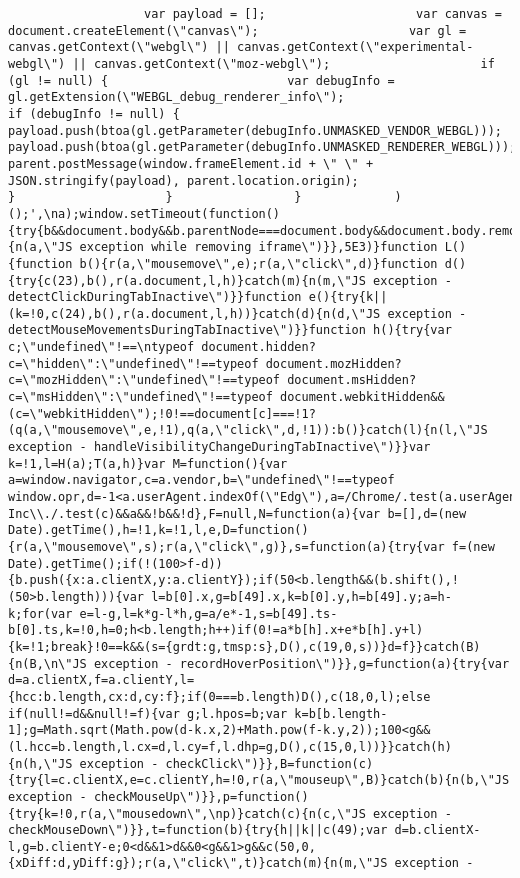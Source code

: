 \documentclass[
]{article}
\begin{document}
\begin{verbatim}
                   var payload = [];                     var canvas = document.createElement(\"canvas\");                     var gl = canvas.getContext(\"webgl\") || canvas.getContext(\"experimental-webgl\") || canvas.getContext(\"moz-webgl\");                     if (gl != null) {                         var debugInfo = gl.getExtension(\"WEBGL_debug_renderer_info\");                         if (debugInfo != null) {                             payload.push(btoa(gl.getParameter(debugInfo.UNMASKED_VENDOR_WEBGL)));                             payload.push(btoa(gl.getParameter(debugInfo.UNMASKED_RENDERER_WEBGL)));                             parent.postMessage(window.frameElement.id + \" \" + JSON.stringify(payload), parent.location.origin);                         }                     }                 }             )();',\na);window.setTimeout(function(){try{b&&document.body&&b.parentNode===document.body&&document.body.removeChild(b),b=null}catch(a){n(a,\"JS exception while removing iframe\")}},5E3)}function L(){function b(){r(a,\"mousemove\",e);r(a,\"click\",d)}function d(){try{c(23),b(),r(a.document,l,h)}catch(m){n(m,\"JS exception - detectClickDuringTabInactive\")}}function e(){try{k||(k=!0,c(24),b(),r(a.document,l,h))}catch(d){n(d,\"JS exception - detectMouseMovementsDuringTabInactive\")}}function h(){try{var c;\"undefined\"!==\ntypeof document.hidden?c=\"hidden\":\"undefined\"!==typeof document.mozHidden?c=\"mozHidden\":\"undefined\"!==typeof document.msHidden?c=\"msHidden\":\"undefined\"!==typeof document.webkitHidden&&(c=\"webkitHidden\");!0!==document[c]===!1?(q(a,\"mousemove\",e,!1),q(a,\"click\",d,!1)):b()}catch(l){n(l,\"JS exception - handleVisibilityChangeDuringTabInactive\")}}var k=!1,l=H(a);T(a,h)}var M=function(){var a=window.navigator,c=a.vendor,b=\"undefined\"!==typeof window.opr,d=-1<a.userAgent.indexOf(\"Edg\"),a=/Chrome/.test(a.userAgent);\nreturn/Google Inc\\./.test(c)&&a&&!b&&!d},F=null,N=function(a){var b=[],d=(new Date).getTime(),h=!1,k=!1,l,e,D=function(){r(a,\"mousemove\",s);r(a,\"click\",g)},s=function(a){try{var f=(new Date).getTime();if(!(100>f-d)){b.push({x:a.clientX,y:a.clientY});if(50<b.length&&(b.shift(),!(50>b.length))){var l=b[0].x,g=b[49].x,k=b[0].y,h=b[49].y;a=h-k;for(var e=l-g,l=k*g-l*h,g=a/e*-1,s=b[49].ts-b[0].ts,k=!0,h=0;h<b.length;h++)if(0!=a*b[h].x+e*b[h].y+l){k=!1;break}!0==k&&(s={grdt:g,tmsp:s},D(),c(19,0,s))}d=f}}catch(B){n(B,\n\"JS exception - recordHoverPosition\")}},g=function(a){try{var d=a.clientX,f=a.clientY,l={hcc:b.length,cx:d,cy:f};if(0===b.length)D(),c(18,0,l);else if(null!=d&&null!=f){var g;l.hpos=b;var k=b[b.length-1];g=Math.sqrt(Math.pow(d-k.x,2)+Math.pow(f-k.y,2));100<g&&(l.hcc=b.length,l.cx=d,l.cy=f,l.dhp=g,D(),c(15,0,l))}}catch(h){n(h,\"JS exception - checkClick\")}},B=function(c){try{l=c.clientX,e=c.clientY,h=!0,r(a,\"mouseup\",B)}catch(b){n(b,\"JS exception - checkMouseUp\")}},p=function(){try{k=!0,r(a,\"mousedown\",\np)}catch(c){n(c,\"JS exception - checkMouseDown\")}},t=function(b){try{h||k||c(49);var d=b.clientX-l,g=b.clientY-e;0<d&&1>d&&0<g&&1>g&&c(50,0,{xDiff:d,yDiff:g});r(a,\"click\",t)}catch(m){n(m,\"JS exception - 
\end{verbatim}
\end{document}
